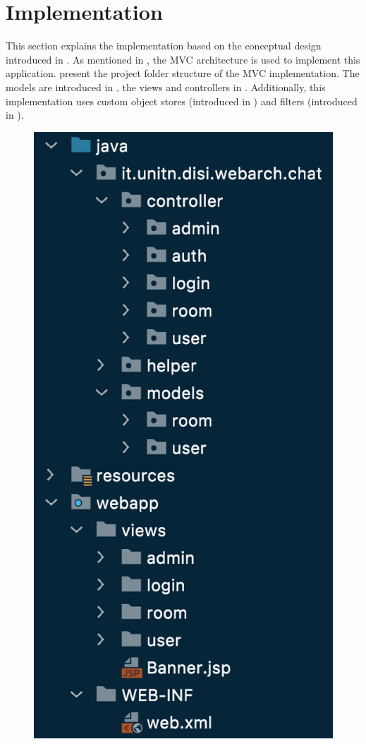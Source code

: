 \section{Implementation}\label{sec:03_impl}
This section explains the implementation based on the conceptual design introduced in . 
As mentioned in , the MVC architecture is used to implement this application.  present the project folder structure of the MVC implementation.
The models are introduced in , the views and controllers in .
Additionally, this implementation uses custom object stores (introduced in ) and filters (introduced in ).
\begin{figure}[h]
\centering
\includegraphics[scale=0.5]{images/03_impl/structure}

\end{figure}
